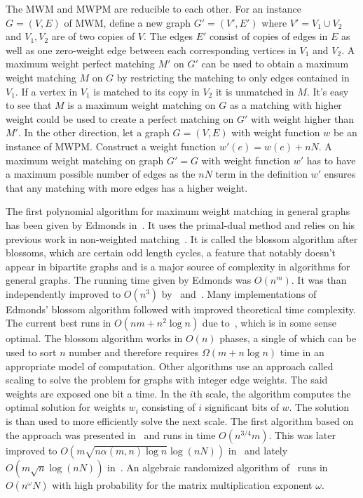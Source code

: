 The \textsc{MWM} and \textsc{MWPM} are reducible to each other. For an instance $G=(V, E)$ of \textsc{MWM}, define a new graph $G'=(V', E')$ where $V'=V_1 \cup V_2$ and $V_1, V_2$ are of two copies of $V$. The edges $E'$ consist of copies of edges in $E$ as well as one zero-weight edge between each corresponding vertices in $V_1$ and $V_2$. A maximum weight perfect matching $M'$ on $G'$ can be used to obtain a maximum weight matching $M$ on $G$ by restricting the matching to only edges contained in $V_1$. If a vertex in $V_1$ is matched to its copy in $V_2$ it is unmatched in $M$. It's easy to see that $M$ is a maximum weight matching on $G$ as a matching with higher weight could be used to create a perfect matching on $G'$ with weight higher than $M'$. In the other direction, let a graph $G=(V, E)$ with weight function $w$ be an instance of \textsc{MWPM}. Construct a weight function $w'(e) = w(e) + nN$. A maximum weight matching on graph $G' = G$ with weight function $w'$ has to have a maximum possible number of edges as the $nN$ term in the definition $w'$ ensures that any matching with more edges has a higher weight.

The first polynomial algorithm for maximum weight matching in general graphs has been given by Edmonds in~\cite{edmonds1965maximum}. It uses the primal-dual method and relies on his previous work in non-weighted matching~\cite{edmonds1965paths}. It is called the blossom algorithm after blossoms, which are certain odd length cycles, a feature that notably doesn't appear in bipartite graphs and is a major source of complexity in algorithms for general graphs. The running time given by Edmonds was $O(n^m)$. It was than independently improved to $O(n^3)$ by~\cite{lawler2001combinatorial} and~\cite{gabow1974implementation}. Many implementations of Edmonds' blossom algorithm followed with improved theoretical time complexity. The current best runs in $O(nm + n^2 \log n)$ due to~\cite{gabow1990data}, which is in some sense optimal. The blossom algorithm works in $O(n)$ phases, a single of which can be used to sort $n$ number and therefore requires $\Omega(m + n \log n)$ time in an appropriate model of computation. Other algorithms use an approach called scaling to solve the problem for graphs with integer edge weights. The said weights are exposed one bit a time. In the $i$th scale, the algorithm computes the optimal solution for weights $w_i$ consisting of $i$ significant bits of $w$. The solution is than used to more efficiently solve the next scale. The first algorithm based on the approach was presented in~\cite{gabow1984efficient} and runs in time $O(n^{3/4}m)$. This was later improved to $O(m \sqrt{n\alpha(m, n) \log n} \log(nN))$ in~\cite{gabow1991faster} and lately $O(m \sqrt{n} \log(nN))$ in~\cite{duan2018scaling}. An algebraic randomized algorithm of~\cite{cygan2015algorithmic} runs in $O(n^\omega N)$ with high probability for the matrix multiplication exponent $\omega$.

